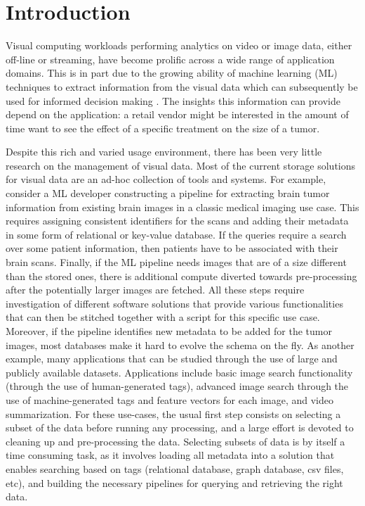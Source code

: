 \section{Introduction}
\label{intro}

Visual computing workloads performing analytics on
video or image data, either off-line or streaming,
have become prolific across a wide range of application domains.
This is in part due to the growing ability of machine learning (ML) techniques to
extract information from the visual data which can subsequently be used
for informed decision making \cite{vdms-nips}.
The insights this information can provide depend on the
application: a retail vendor might be interested in the amount of time
want to see the effect of a specific treatment on the size of a tumor.

Despite this rich and varied usage environment, there has been very little
research on the management of visual data.
Most of the current storage solutions for visual data are
an ad-hoc collection of tools and systems. 
For example, consider a ML developer constructing a pipeline
for extracting brain tumor information from existing brain images in a
classic medical imaging use case. 
This requires assigning consistent
identifiers for the scans and adding their metadata in
some form of relational or key-value database. 
If the queries require a search over some patient information, 
then patients have to be associated with their brain scans. 
Finally, if the ML pipeline needs images that
are of a size different than the stored ones, there is additional compute
diverted towards pre-processing after the potentially larger images are fetched. 
All these steps require investigation of different software
solutions that provide various functionalities that can then be stitched
together with a script for this specific use case.
Moreover, if the pipeline identifies
new metadata to be added for the tumor images, most databases make it
hard to evolve the schema on the fly.
As another example, many applications that can be studied through the use of large
and publicly available datasets. 
Applications include basic image search functionality (through the use
of human-generated tags), advanced image search through the use of
machine-generated tags and feature vectors\cite{imagesearch} 
for each image, and video summarization.
For these use-cases, the usual first step consists on selecting a 
subset of the data before running any processing, and a large effort 
is devoted to cleaning up and pre-processing the data.
Selecting subsets of data is by itself a time consuming task,
as it involves loading all metadata into a solution that enables searching
based on tags (relational database, graph database, csv files, etc), and
building the necessary pipelines for querying and retrieving the right data.

